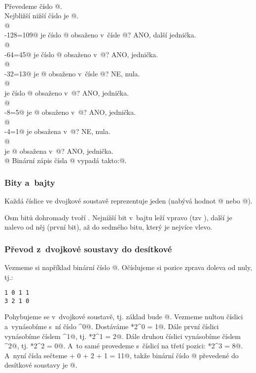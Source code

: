 \D {}\\
Převedeme číslo @. \\ 
Nejbližší nižší číslo je @. \\ 
 @  \\
-128=109@ je číslo @ obsaženo v~čísle @? ANO, další jednička. \\
@ \\ 
-64=45@ je číslo @ obsaženo v~@? ANO, jednička. \\
@  \\ 
-32=13@ je @ obsaženo v~čísle @? NE, nula. \\ 
@  \\ 
je číslo @ obsaženo v~@? ANO, jednička. \\
@ \\ 
-8=5@ je @ obsaženo v~@? ANO, jednička. \\
@ \\ 
-4=1@ je  obsažena v~@? NE, nula. \\
@ \\
je @ obsažena v~@? ANO, jednička. \\
@
Binární zápis čísla @ vypadá takto:@.

\subsubsection{Bity a~bajty}

Každá číslice ve dvojkové soustavě reprezentuje jeden  (nabývá hodnot @ nebo @). 

\D Osm bitů dohromady tvoří . Nejnižší bit v~bajtu leží vpravo (tzv ), další je nalevo od něj (první bit), až do sedmého bitu, který je nejvíce vlevo.  

\subsubsection{Převod z~dvojkové soustavy do desítkové}

Vezmeme si například binární číslo @. Očíslujeme si pozice zprava doleva od nuly, tj.:
\begin{verbatim}
1 0 1 1
3 2 1 0
\end{verbatim}
Pohybujeme se v~dvojkové soustavě, tj. základ bude @. Vezmeme nultou číslici a~vynásobíme s~ní číslo ^0@. 
Dostáváme *2^0 = 1@.
Dále první číslici vynásobíme číslem ^1@, tj. *2^1 = 2@.
Dále druhou číslici vynásobíme číslem ^2@, tj. *2^2 = 0@.
A~to samé provedeme s~číslicí na třetí pozici: *2^3 = 8@.
A~nyní čísla sečteme  + 0 + 2 + 1 = 11@, takže binární číslo @ převedené do desítkové soustavy je @.

